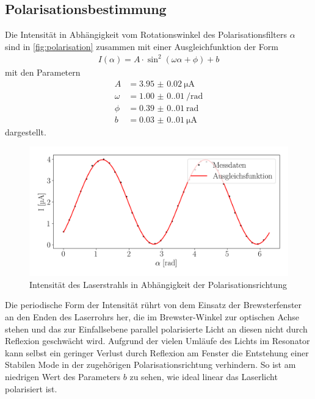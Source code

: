 \subsection{Polarisationsbestimmung}
Die Intensität in Abhängigkeit vom Rotationswinkel des Polarisationsfilters $\alpha$ sind in \autoref{fig:polarisation} zusammen mit einer Ausgleichfunktion der Form
\begin{align}
    I(\alpha)= A\cdot \sin^2{\left(\omega\alpha+\phi\right)}+b
\end{align}
mit den Parametern
\begin{align}
    A &= \SI{3.95(2)}{\micro\ampere} \\
    \omega &= \SI{1.00(0.01)}{\per\radian} \\
    \phi &= \SI{0.39(0.01)}{\radian} \\
    b &= \SI{0.03(0.01)}{\micro\ampere}
\end{align}
dargestellt.
\begin{figure}[H]
    \centering
    \includegraphics[scale=0.55]{Skripte/polarisation.png}
    \caption{Intensität des Laserstrahls in Abhängigkeit der Polarisationsrichtung}\label{fig:polarisation}
\end{figure}
Die periodische Form der Intensität rührt von dem Einsatz der Brewsterfenster an den Enden des Laserrohrs her, die im Brewster-Winkel zur optischen Achse stehen und das zur Einfallsebene parallel polarisierte Licht an diesen nicht durch Reflexion geschwächt wird. Aufgrund der vielen Umläufe des Lichts im Resonator kann selbst ein geringer Verlust durch Reflexion am Fenster die Entstehung einer Stabilen Mode in der zugehörigen Polarisationsrichtung verhindern.
So ist am niedrigen Wert des Parameters $b$ zu sehen, wie ideal linear das Laserlicht polarisiert ist.
